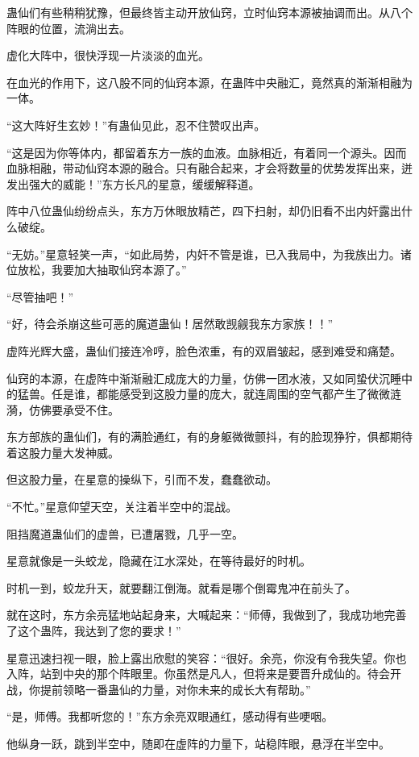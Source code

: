 \begin{this_body}
蛊仙们有些稍稍犹豫，但最终皆主动开放仙窍，立时仙窍本源被抽调而出。从八个阵眼的位置，流淌出去。

虚化大阵中，很快浮现一片淡淡的血光。

在血光的作用下，这八股不同的仙窍本源，在蛊阵中央融汇，竟然真的渐渐相融为一体。

“这大阵好生玄妙！”有蛊仙见此，忍不住赞叹出声。

“这是因为你等体内，都留着东方一族的血液。血脉相近，有着同一个源头。因而血脉相融，带动仙窍本源的融合。只有融合起来，才会将数量的优势发挥出来，迸发出强大的威能！”东方长凡的星意，缓缓解释道。

阵中八位蛊仙纷纷点头，东方万休眼放精芒，四下扫射，却仍旧看不出内奸露出什么破绽。

“无妨。”星意轻笑一声，“如此局势，内奸不管是谁，已入我局中，为我族出力。诸位放松，我要加大抽取仙窍本源了。”

“尽管抽吧！”

“好，待会杀崩这些可恶的魔道蛊仙！居然敢觊觎我东方家族！！”

虚阵光辉大盛，蛊仙们接连冷哼，脸色浓重，有的双眉皱起，感到难受和痛楚。

仙窍的本源，在虚阵中渐渐融汇成庞大的力量，仿佛一团水液，又如同蛰伏沉睡中的猛兽。任是谁，都能感受到这股力量的庞大，就连周围的空气都产生了微微涟漪，仿佛要承受不住。

东方部族的蛊仙们，有的满脸通红，有的身躯微微颤抖，有的脸现狰狞，俱都期待着这股力量大发神威。

但这股力量，在星意的操纵下，引而不发，蠢蠢欲动。

“不忙。”星意仰望天空，关注着半空中的混战。

阻挡魔道蛊仙们的虚兽，已遭屠戮，几乎一空。

星意就像是一头蛟龙，隐藏在江水深处，在等待最好的时机。

时机一到，蛟龙升天，就要翻江倒海。就看是哪个倒霉鬼冲在前头了。

就在这时，东方余亮猛地站起身来，大喊起来：“师傅，我做到了，我成功地完善了这个蛊阵，我达到了您的要求！”

星意迅速扫视一眼，脸上露出欣慰的笑容：“很好。余亮，你没有令我失望。你也入阵，站到中央的那个阵眼里。你虽然是凡人，但将来是要晋升成仙的。待会开战，你提前领略一番蛊仙的力量，对你未来的成长大有帮助。”

“是，师傅。我都听您的！”东方余亮双眼通红，感动得有些哽咽。

他纵身一跃，跳到半空中，随即在虚阵的力量下，站稳阵眼，悬浮在半空中。


\end{this_body}
